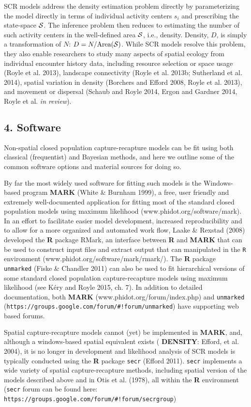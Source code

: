 \documentclass{book}
\begin{document}
SCR models address the density estimation problem directly by
parameterizing the model directly in terms of individual activity
centers $s_i$ and prescribing the state-space ${\cal S}$. The
inference problem then reduces to estimating the number of such
activity centers in the well-defined area ${\cal S}$, i.e., density.
Density, $D$, is simply a transformation of $N$: $D =
N/\mbox{Area}({\cal S})$.  While SCR models resolve this problem, they
also enable researchers to study many aspects of spatial ecology from
individual encounter history data, including resource selection or
space usage (Royle et al. 2013), landscape connectivity (Royle et
al. 2013b; Sutherland et al. 2014), spatial variation in density
(Borchers and Efford 2008, Royle et al. 2013), and movement or
dispersal (Schaub and Royle 2014, Ergon and Gardner 2014, Royle et
al. {\it in review}).

\subsection*{4. Software}

Non-spatial closed population capture-recapture models can be fit
using both classical (frequentist) and Bayesian methods, and here we
outline some of the common software options and material sources for
doing so.

By far the most widely used software for fitting such models is the
Windows-based program {\bf MARK} (White \& Burnham 1999), a free, user
friendly and extremely well-documented application for fitting most of
the standard closed population models using maximum likelihood
(www.phidot.org/software/mark). In an effort to facilitate easier
model development, increased reproducibility and to allow for a more
organized and automated work flow, Laake \& Rexstad (2008) developed
the {\bf R} package {RMark}, an interface between {\bf R} and {\bf
  MARK} that can be used to construct input files and extract output
that can manipulated in the {\tt R} environment
(www.phidot.org/software/mark/rmark/). The {\bf R} package {\tt
  unmarked} (Fiske \& Chandler 2011)
can also be used to fit hierarchical versions of some
standard closed population capture-recapture models using maximum
likelihood (see K\'{e}ry and Royle 2015, ch. 7). 
In addition to detailed
documentation, both {\bf MARK} (www.phidot.org/forum/index.php) and
{\tt unmarked}
(\verb|https://groups.google.com/forum/#!forum/unmarked|) have
supporting web based forums.

Spatial capture-recapture models cannot (yet) be implemented in {\bf
  MARK}, and, although a windows-based spatial equivalent exists ({\bf
  DENSITY}: Efford, et al. 2004), it is no longer in development and
likelihood analysis of SCR models is typically conducted using the
{\bf R} package {\tt secr} (Efford 2011). {\tt secr} implements a wide
variety of spatial capture-recapture methods, including spatial
version of the models described above and in Otis et al. (1978), all
within the {\bf R} environment ({\tt secr} forum can be found here:
\verb|https://groups.google.com/forum/#!forum/secrgroup|)
\end{document}
